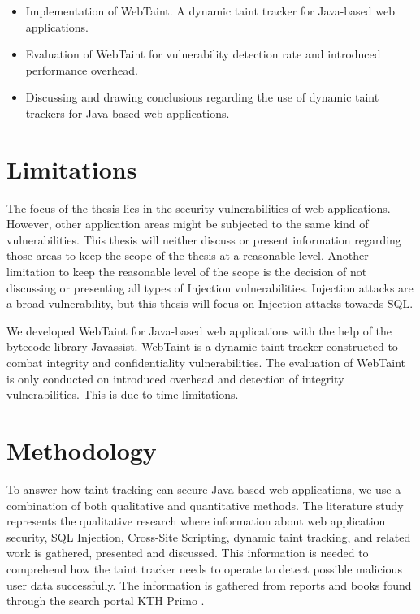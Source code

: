 \begin{itemize}  
    \item Implementation of WebTaint. A dynamic taint tracker for Java-based web applications.
    \item Evaluation of WebTaint for vulnerability detection rate and introduced performance overhead.
    \item Discussing and drawing conclusions regarding the use of dynamic taint trackers for Java-based web applications.
\end{itemize}



\section{Limitations}
\label{Delimitations}
The focus of the thesis lies in the security vulnerabilities of web applications. However, other application areas might be subjected to the same kind of vulnerabilities. This thesis will neither discuss or present information regarding those areas to keep the scope of the thesis at a reasonable level. Another limitation to keep the reasonable level of the scope is the decision of not discussing or presenting all types of Injection vulnerabilities. Injection attacks are a broad vulnerability, but this thesis will focus on Injection attacks towards SQL.

We developed WebTaint for Java-based web applications with the help of the bytecode library Javassist. WebTaint is a dynamic taint tracker constructed to combat integrity and confidentiality vulnerabilities. The evaluation of WebTaint is only conducted on introduced overhead and detection of integrity vulnerabilities. This is due to time limitations.



\section{Methodology}
\label{Methodology}
To answer how taint tracking can secure Java-based web applications, we use a combination of both qualitative and quantitative methods. The literature study represents the qualitative research where information about web application security, SQL Injection, Cross-Site Scripting, dynamic taint tracking, and related work is gathered, presented and discussed. This information is needed to comprehend how the taint tracker needs to operate to detect possible malicious user data successfully. The information is gathered from reports and books found through the search portal KTH Primo \parencite{primo}.

